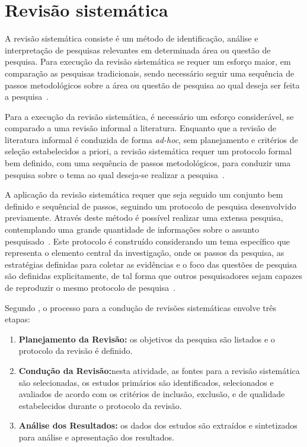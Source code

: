 \label{chapter:correlatos}


\section{Revisão sistemática}

A revisão sistemática consiste é um método de identificação, análise e interpretação de pesquisas relevantes em determinada área ou questão de pesquisa. Para execução da revisão sistemática se requer um esforço maior, em comparação as pesquisas tradicionais, sendo necessário seguir uma sequência de passos metodológicos sobre a área ou questão de pesquisa ao qual deseja ser feita a pesquisa~\cite{kitchenham2004procedures}.

Para a execução da revisão sistemática, é necessário um esforço considerável, se comparado a uma revisão informal a literatura. Enquanto que a revisão de literatura informal é conduzida de forma \textit{ad-hoc}, sem planejamento e critérios de seleção estabelecidos a priori, a revisão sistemática requer um protocolo formal bem definido, com uma sequência de passos metodológicos, para conduzir uma pesquisa sobre o tema ao qual deseja-se realizar a pesquisa~\cite{MafraTravassos}.

A aplicação da revisão sistemática requer que seja seguido um conjunto bem definido e sequêncial de passos, seguindo um protocolo de pesquisa desenvolvido previamente. Através deste método é possível realizar uma extensa pesquisa, contemplando uma grande quantidade de informações sobre o assunto pesquisado~\cite{MafraTravassos}. Este protocolo é construído considerando um tema específico que representa o elemento central da investigação, onde os passos da pesquisa, as estratégias definidas para coletar as evidências e o foco das questões de pesquisa são definidas explicitamente, de tal forma que outros pesquisadores sejam capazes de reproduzir o mesmo protocolo de pesquisa~\cite{biolchini2005systematic}.

Segundo \citeauthor{MafraTravassos}, o processo para a condução de revisões sistemáticas envolve três etapas:
\begin{enumerate}
  \item \textbf{Planejamento da Revisão:} os objetivos da pesquisa são listados e o protocolo da revisão é definido.
  \item \textbf{Condução da Revisão:}nesta atividade, as fontes para a revisão sistemática são selecionadas, os estudos primários são identificados, selecionados e avaliados de acordo com os critérios de inclusão, exclusão, e de qualidade estabelecidos durante o protocolo da revisão.
  \item \textbf{Análise dos Resultados:} os dados dos estudos são extraídos e sintetizados para análise e apresentação dos resultados.
\end{enumerate}

